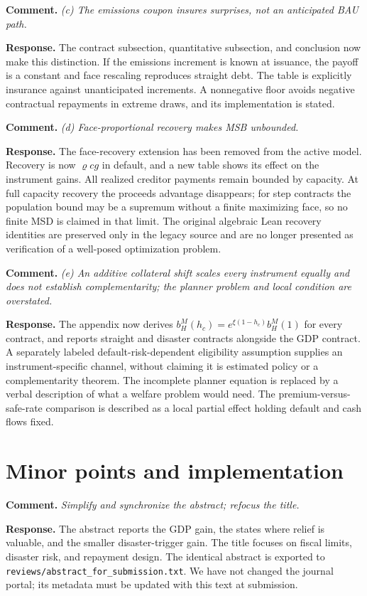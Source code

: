 \documentclass[11pt]{article}
\newcommand{\comment}[1]{\par\medskip\Needspace{7\baselineskip}\noindent\textbf{Comment.} \emph{#1}\par\smallskip}
\newcommand{\response}{\noindent\textbf{Response.} }
\begin{document}
\comment{(c) The emissions coupon insures surprises, not an anticipated BAU path.}
\response The contract subsection, quantitative subsection, and conclusion now make this distinction. If the emissions increment is known at issuance, the payoff is a constant and face rescaling reproduces straight debt. The table is explicitly insurance against unanticipated increments. A nonnegative floor avoids negative contractual repayments in extreme draws, and its implementation is stated.

\comment{(d) Face-proportional recovery makes MSB unbounded.}
\response The face-recovery extension has been removed from the active model. Recovery is now $\varrho cg$ in default, and a new table shows its effect on the instrument gains. All realized creditor payments remain bounded by capacity. At full capacity recovery the proceeds advantage disappears; for step contracts the population bound may be a supremum without a finite maximizing face, so no finite MSD is claimed in that limit. The original algebraic Lean recovery identities are preserved only in the legacy source and are no longer presented as verification of a well-posed optimization problem.

\comment{(e) An additive collateral shift scales every instrument equally and does not establish complementarity; the planner problem and local condition are overstated.}
\response The appendix now derives $b_H^M(h_c)=e^{\xi(1-h_c)}b_H^M(1)$ for every contract, and reports straight and disaster contracts alongside the GDP contract. A separately labeled default-risk-dependent eligibility assumption supplies an instrument-specific channel, without claiming it is estimated policy or a complementarity theorem. The incomplete planner equation is replaced by a verbal description of what a welfare problem would need. The premium-versus-safe-rate comparison is described as a local partial effect holding default and cash flows fixed.

\section*{Minor points and implementation}
\comment{Simplify and synchronize the abstract; refocus the title.}
\response The abstract reports the GDP gain, the states where relief is valuable, and the smaller disaster-trigger gain. The title focuses on fiscal limits, disaster risk, and repayment design. The identical abstract is exported to \texttt{reviews/abstract\_for\_submission.txt}. We have not changed the journal portal; its metadata must be updated with this text at submission.
\end{document}

